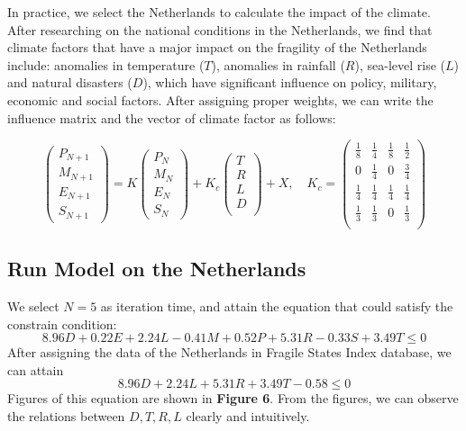 \documentclass{mcmthesis}
\begin{document}
	In practice, we select the Netherlands to calculate the impact of the climate. After researching on the national conditions in the Netherlands, we find that climate factors that have a major impact on the fragility of the Netherlands include: anomalies in temperature ($T$), anomalies in rainfall ($R$), sea-level rise ($L$) and natural disasters ($D$), which have significant influence on policy, military, economic and social factors. After assigning proper weights, we can write the influence matrix and the vector of climate factor as follows:
	\begin{spacing}{1.5}
	$$
	\left(
	\begin{matrix}
	P_{N+1} \\ M_{N+1} \\ E_{N+1} \\ S_{N+1}
	\end{matrix}
	\right) 
	= 
	K 
	\left(
	\begin{matrix}
	P_N \\ M_N \\ E_N \\ S_N
	\end{matrix}
	\right) 
	+
	K_c
	\left(
	\begin{matrix}
	T \\ R \\ L \\ D \\
	\end{matrix}
	\right)
	+ X
	, \quad
	K_c = 
	\left(
	\begin{matrix}
		\frac{1}{8} & \frac{1}{4} & \frac{1}{8} & \frac{1}{2} \\
		0 & \frac{1}{4} & 0 & \frac{3}{4} \\
		\frac{1}{4} & \frac{1}{4} & \frac{1}{4} & \frac{1}{4} \\
		\frac{1}{3} & \frac{1}{3} & 0 & \frac{1}{3} \\
	\end{matrix}
	\right)
	$$
	\end{spacing}

	\subsection{Run Model on the Netherlands}
	We select $N = 5$ as iteration time, and attain the equation that could satisfy the constrain condition:
	$$
	8.96D + 0.22E + 2.24L - 0.41M + 0.52P + 5.31R - 0.33S + 3.49T\leq0
	$$
	After assigning the data of the Netherlands in Fragile States Index database, we can attain
	$$
	8.96D + 2.24L + 5.31R + 3.49T - 0.58\leq0
	$$
	Figures of this equation are shown in \textbf{Figure 6}. From the figures, we can observe the relations between $D,T,R,L$ clearly and intuitively.
	
\end{document}
